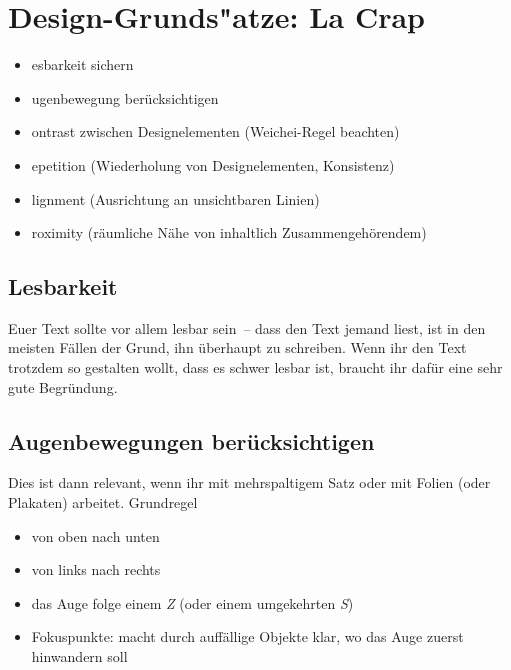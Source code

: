 \section{Design-Grunds"atze: La Crap}
\label{lacrap}


\begin{itemize}
\item {}esbarkeit sichern
\item {}ugenbewegung berücksichtigen

\smallskip
\item {}ontrast zwischen Designelementen (Weichei-Regel beachten)
\item {}epetition (Wiederholung von Designelementen, Konsistenz)
\item {}lignment (Ausrichtung an unsichtbaren Linien)
\item {}roximity (räumliche Nähe von inhaltlich Zusammengehörendem)
\end{itemize}

\subsection{Lesbarkeit}
Euer Text sollte vor allem lesbar sein~-- dass den Text jemand liest, ist in den meisten Fällen der Grund, ihn überhaupt zu schreiben. Wenn ihr den Text trotzdem so gestalten wollt, dass es schwer lesbar ist, braucht ihr dafür eine sehr gute Begründung.

\subsection{Augenbewegungen berücksichtigen}
Dies ist dann relevant, wenn ihr mit mehrspaltigem Satz oder mit Folien (oder Plakaten) arbeitet. Grundregel
\begin{itemize}
  \item von oben nach unten
  \item von links nach rechts
  \item das Auge folge einem \emph{Z} (oder einem umgekehrten \emph{S})
  \item Fokuspunkte: macht durch auffällige Objekte klar, wo das Auge zuerst hinwandern soll
\end{itemize}

